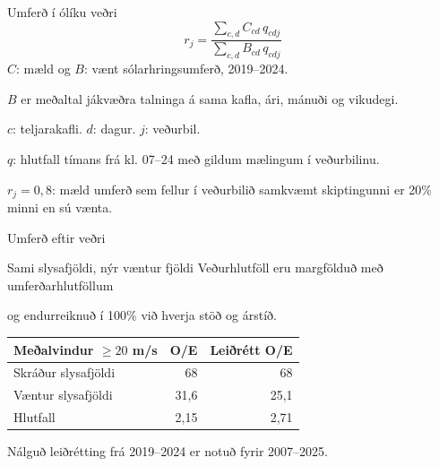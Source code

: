 \documentclass[aspectratio=169,12pt,t]{beamer}
\begin{document}
\begin{frame}{Umferð í ólíku veðri}
\relax
\setlength{\parskip}{2pt}
\setlength{\abovedisplayskip}{6pt}
\setlength{\belowdisplayskip}{6pt}
{\Large\setlength{\abovedisplayskip}{4pt}\setlength{\belowdisplayskip}{4pt}\[
r_j=\frac{\sum_{c,d}C_{cd}\,q_{cdj}}{\sum_{c,d}B_{cd}\,q_{cdj}}
\]}
$C$: mæld og $B$: vænt sólarhringsumferð, 2019--2024.\par
$B$ er meðaltal jákvæðra talninga á sama kafla, ári, mánuði og vikudegi.\par
\vspace{2mm}
$c$: teljarakafli. $d$: dagur. $j$: veðurbil.\par
$q$: hlutfall tímans frá kl. 07--24 með gildum mælingum í veðurbilinu.\par
\vspace{3mm}
$r_j=0{,}8$: mæld umferð sem fellur í veðurbilið samkvæmt skiptingunni er 20\% minni en sú vænta.\par
\end{frame}

\begin{frame}{Umferð eftir veðri}
\relax
{}
\end{frame}

\begin{frame}{Sami slysafjöldi, nýr væntur fjöldi}
\relax
Veðurhlutföll eru margfölduð með umferðarhlutföllum\par
og endurreiknuð í 100\% við hverja stöð og árstíð.\par
\vspace{4mm}
\renewcommand{\arraystretch}{1.35}
\begin{tabular}{@{}lrr@{}}\toprule
Meðalvindur $\geq20$ m/s & O/E & Leiðrétt O/E\\\midrule
Skráður slysafjöldi & 68 & 68\\
Væntur slysafjöldi & 31,6 & 25,1\\
Hlutfall & 2,15 & 2,71\\\bottomrule
\end{tabular}\par
\vspace{4mm}
{\small Nálguð leiðrétting frá 2019--2024 er notuð fyrir 2007--2025.\par}
\end{frame}
\end{document}
